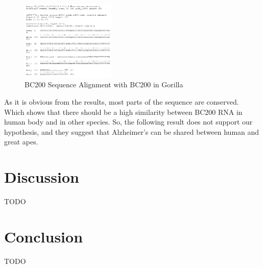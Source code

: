 \documentclass[conference]{IEEEtran}
\begin{document}
\begin{figure}
  \centering
  \includegraphics[width=0.4\textwidth]{figs/TK1PBYHT114-Alignment-page-1.png}
  \caption{BC200 Sequence Alignment with BC200 in Gorilla}
\end{figure}

As it is obvious from the results, most parts of the sequence are conserved. Which shows that there should be a high similarity between BC200 RNA in human body and in other species. So, the following result does not support our hypothesis, and they suggest that Alzheimer’s can be shared between human and great apes.

\section{Discussion}\label{sec:discussion}
TODO

\section{Conclusion}\label{sec:conclusion}
TODO



\end{document}
